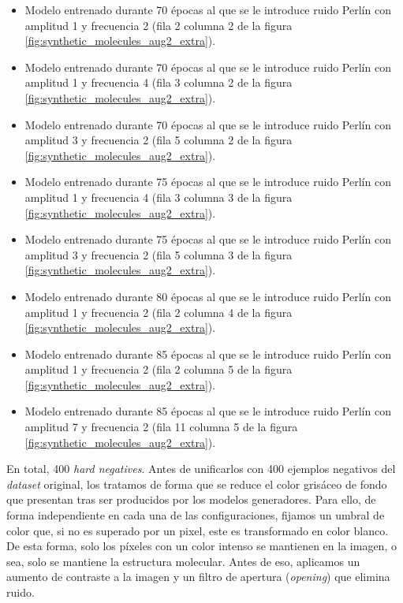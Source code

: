 \begin{itemize}
    \item Modelo entrenado durante 70 épocas al que se le introduce ruido Perlín con amplitud 1 y frecuencia 2 (fila 2 columna 2 de la figura \ref{fig:synthetic_molecules_aug2_extra}).
    \item Modelo entrenado durante 70 épocas al que se le introduce ruido Perlín con amplitud 1 y frecuencia 4 (fila 3 columna 2 de la figura \ref{fig:synthetic_molecules_aug2_extra}).
    \item Modelo entrenado durante 70 épocas al que se le introduce ruido Perlín con amplitud 3 y frecuencia 2 (fila 5 columna 2 de la figura \ref{fig:synthetic_molecules_aug2_extra}).
    \item Modelo entrenado durante 75 épocas al que se le introduce ruido Perlín con amplitud 1 y frecuencia 4 (fila 3 columna 3 de la figura \ref{fig:synthetic_molecules_aug2_extra}).
    \item Modelo entrenado durante 75 épocas al que se le introduce ruido Perlín con amplitud 3 y frecuencia 2 (fila 5 columna 3 de la figura \ref{fig:synthetic_molecules_aug2_extra}).
    \item Modelo entrenado durante 80 épocas al que se le introduce ruido Perlín con amplitud 1 y frecuencia 2 (fila 2 columna 4 de la figura \ref{fig:synthetic_molecules_aug2_extra}).
    \item Modelo entrenado durante 85 épocas al que se le introduce ruido Perlín con amplitud 1 y frecuencia 2 (fila 2 columna 5 de la figura \ref{fig:synthetic_molecules_aug2_extra}).
    \item Modelo entrenado durante 85 épocas al que se le introduce ruido Perlín con amplitud 7 y frecuencia 2 (fila 11 columna 5 de la figura \ref{fig:synthetic_molecules_aug2_extra}).
\end{itemize}

En total, 400 \textit{hard negatives}. Antes de unificarlos con 400 ejemplos negativos del \textit{dataset} original, los tratamos de forma que se reduce el color grisáceo de fondo que presentan tras ser producidos por los modelos generadores. Para ello, de forma independiente en cada una de las configuraciones, fijamos un umbral de color que, si no es superado por un pixel, este es transformado en color blanco. De esta forma, solo los píxeles con un color intenso se mantienen en la imagen, o sea, solo se mantiene la estructura molecular. Antes de eso, aplicamos un aumento de contraste a la imagen y un filtro de apertura (\textit{opening}) que elimina ruido.


